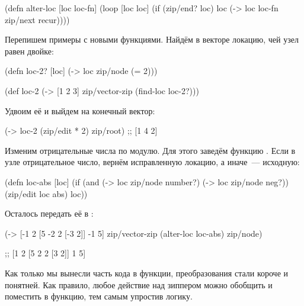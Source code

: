 \begin{english}
  \begin{clojure}
(defn alter-loc [loc loc-fn]
  (loop [loc loc]
    (if (zip/end? loc)
      loc
      (-> loc loc-fn zip/next recur))))
  \end{clojure}
\end{english}

Перепишем примеры с новыми функциями. Найдём в векторе локацию, чей узел равен
двойке:

\begin{english}
  \begin{clojure}
(defn loc-2? [loc]
  (-> loc zip/node (= 2)))

(def loc-2
  (-> [1 2 3]
      zip/vector-zip
      (find-loc loc-2?)))
  \end{clojure}
\end{english}

Удвоим её и выйдем на конечный вектор:

\begin{english}
  \begin{clojure}
(-> loc-2 (zip/edit * 2) zip/root)
;; [1 4 2]
  \end{clojure}
\end{english}

Изменим отрицательные числа по модулю. Для этого заведём функцию . Если
в узле отрицательное число, вернём исправленную локацию, а иначе~--- исходную:

\begin{english}
  \begin{clojure}
(defn loc-abs [loc]
  (if (and (-> loc zip/node number?)
           (-> loc zip/node neg?))
    (zip/edit loc abs)
    loc))
  \end{clojure}
\end{english}

Осталось передать её в :

\begin{english}
  \begin{clojure}
(-> [-1 2 [5 -2 2 [-3 2]] -1 5]
    zip/vector-zip
    (alter-loc loc-abs)
    zip/node)

;; [1 2 [5 2 2 [3 2]] 1 5]
  \end{clojure}
\end{english}

Как только мы вынесли часть кода в функции, преобразования стали короче и
понятней. Как правило, любое действие над зиппером можно обобщить и поместить в
функцию, тем самым упростив логику.

